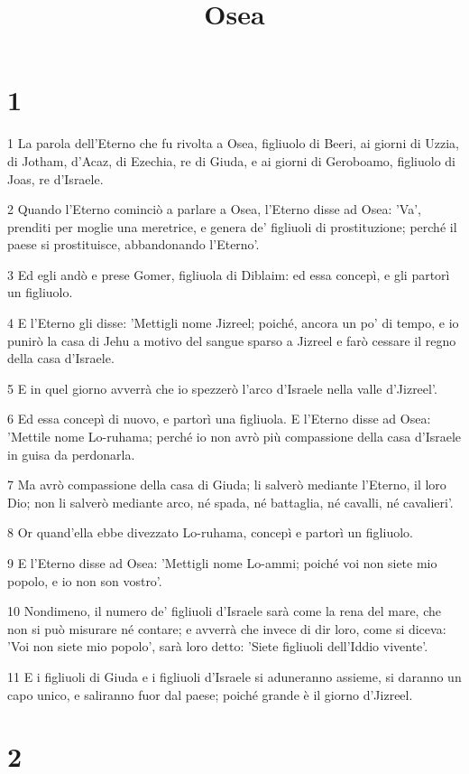 

\title{Osea}


\chapter{1}

\par 1 La parola dell'Eterno che fu rivolta a Osea, figliuolo di Beeri, ai giorni di Uzzia, di Jotham, d'Acaz, di Ezechia, re di Giuda, e ai giorni di Geroboamo, figliuolo di Joas, re d'Israele.
\par 2 Quando l'Eterno cominciò a parlare a Osea, l'Eterno disse ad Osea: 'Va', prenditi per moglie una meretrice, e genera de' figliuoli di prostituzione; perché il paese si prostituisce, abbandonando l'Eterno'.
\par 3 Ed egli andò e prese Gomer, figliuola di Diblaim: ed essa concepì, e gli partorì un figliuolo.
\par 4 E l'Eterno gli disse: 'Mettigli nome Jizreel; poiché, ancora un po' di tempo, e io punirò la casa di Jehu a motivo del sangue sparso a Jizreel e farò cessare il regno della casa d'Israele.
\par 5 E in quel giorno avverrà che io spezzerò l'arco d'Israele nella valle d'Jizreel'.
\par 6 Ed essa concepì di nuovo, e partorì una figliuola. E l'Eterno disse ad Osea: 'Mettile nome Lo-ruhama; perché io non avrò più compassione della casa d'Israele in guisa da perdonarla.
\par 7 Ma avrò compassione della casa di Giuda; li salverò mediante l'Eterno, il loro Dio; non li salverò mediante arco, né spada, né battaglia, né cavalli, né cavalieri'.
\par 8 Or quand'ella ebbe divezzato Lo-ruhama, concepì e partorì un figliuolo.
\par 9 E l'Eterno disse ad Osea: 'Mettigli nome Lo-ammi; poiché voi non siete mio popolo, e io non son vostro'.
\par 10 Nondimeno, il numero de' figliuoli d'Israele sarà come la rena del mare, che non si può misurare né contare; e avverrà che invece di dir loro, come si diceva: 'Voi non siete mio popolo', sarà loro detto: 'Siete figliuoli dell'Iddio vivente'.
\par 11 E i figliuoli di Giuda e i figliuoli d'Israele si aduneranno assieme, si daranno un capo unico, e saliranno fuor dal paese; poiché grande è il giorno d'Jizreel.

\chapter{2}

